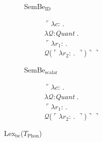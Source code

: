 \begin{description}
        \begin{description}
          
        \item[\textnormal{SemBe$_{\text{ID}}$}] \mbox{}

          $\ulcorner\lambda c$: . \\
        \hspace*{1em}$\lambda\mathcal{Q}$:\textit{Quant} . \\
        \hspace*{2em} $\ulcorner\lambda r_1$:
. \\
\hspace*{3em} $\mathcal{Q}$($\ulcorner\lambda
r_2$:
. $\urcorner$)$\urcorner\urcorner$

\item[\textnormal{SemBe$_{\text{scalar}}$}] \mbox{}

  $\ulcorner\lambda c$: . \\
        \hspace*{1em}$\lambda\mathcal{Q}$:\textit{Quant} . \\
        \hspace*{2em} $\ulcorner\lambda r_1$:
. \\
\hspace*{3em} $\mathcal{Q}$($\ulcorner\lambda
r_2$:
. $\urcorner$)$\urcorner\urcorner$

\end{description}


\item[\textnormal{Lex$_{\mathrm{be}}$($T_{\mathrm{Phon}}$)}] \mbox{}


\end{description}
